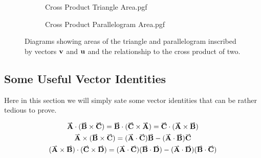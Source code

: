 \documentclass[main.tex]{subfiles}
\begin{document}
                    \begin{figure}[!h]
                        \centering
                        \begin{subfigure}[t]{0.45\textwidth}
                            \centering
                            \scalebox{0.65}
                            {
                            \begin{adjustbox}{clip,trim=30mm 10mm 15mm 10mm}
                                {{Cross Product Triangle Area.pgf}}
                            \end{adjustbox}
                            }
                        \end{subfigure}
                        \hfill
                        \begin{subfigure}[t]{0.45\textwidth}
                            \centering
                            \scalebox{0.65}
                            {
                            \begin{adjustbox}{clip,trim=30mm 10mm 15mm 10mm}
                                {{Cross Product Parallelogram Area.pgf}}
                            \end{adjustbox}
                            }
                        \end{subfigure}
                        \vspace{-5mm}
                        \caption{Diagrams showing areas of the triangle and parallelogram inscribed by vectors $\boldsymbol{\mathbf{v}}$ and $\boldsymbol{\mathbf{u}}$ and the relationship to the cross product of two.}
                        \label{fig: Area of Cross Product}
                    \end{figure}
        
                    \newpage

            \subsection{Some Useful Vector Identities}

                Here in this section we will simply sate some vector identities that can be rather tedious to prove.

                \begin{gather}
                    \vect{A}\cdot(\vect{B}\times\vect{C}) = \vect{B}\cdot(\vect{C}\times\vect{A}) = \vect{C}\cdot(\vect{A}\times\vect{B})\\
                    \vect{A}\times(\vect{B}\times\vect{C}) = (\vect{A}\cdot\vect{C})\vect{B} - (\vect{A}\cdot\vect{B})\vect{C}\\
                    (\vect{A}\times\vect{B})\cdot (\vect{C}\times\vect{D}) = (\vect{A}\cdot\vect{C})(\vect{B}\cdot\vect{D}) - (\vect{A}\cdot\vect{D})(\vect{B}\cdot\vect{C})
                \end{gather}
                    
\end{document}
